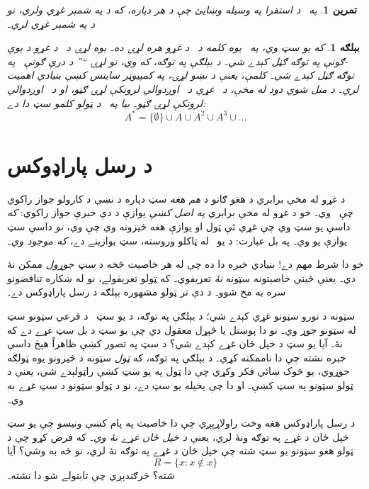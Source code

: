 \documentclass[12pt,a4paper]{article}
\newcommand{\Setabs}[2]{\{#1 : #2\}}
\newcommand{\tuple}[1]{\langle #1\rangle}
\newcommand{\olfileid}[3]{\gdef\pspart{#1}\gdef\pschapter{#2}\gdef\pssection{#3}}
\newcommand{\olsection}[1]{\section{#1}\label{\pspart:\pschapter:\pssection:sec}}
\newtheorem{ex}[defn]{بېلګه}
\newtheorem{prob}[defn]{تمرين}
\begin{document}
\begin{prob}
په~ د استقرا په وسيله وښايئ چې د هر  دپاره، که  د  په شمېر غړي ولري، نو  د  په شمېر غړي لري۔
\end{prob}

\begin{ex}
که  يو سټ وي، په~ يوه \emph{کلمه} د~ د غړو هره لړۍ ده۔ يوه لړۍ د~ د غړو د يوې -ګونې په توګه ګڼل کېدے شي۔ د بېلګې په توګه، که  وي، نو لړۍ ``'' د درې ګونې~\LR{$\tuple{b, a, c}$} په توګه ګڼل کېدے شي۔ کلمې، يعنې د نښو لړۍ، په کمپيوټر ساينس کښې بنيادي اهميت لري۔ د منل شوي دود له مخې، د~ غړي د~ اوږدوالي لرونکې لړۍ ګڼو، او \LR{$\emptyset$} د~ اوږدوالي لرونکې لړۍ ګڼو۔ بيا په~ د \emph{ټولو} کلمو سټ دا دے:
\[
A^* = \{\emptyset\} \cup A \cup A^2 \cup A^3 \cup \dots
\]
\end{ex}



\olfileid{sfr}{set}{rus}
\olsection{د رسل پاراډوکس}

د غړو له مخې برابري د هغو  ګانو د \emph{هم هغه} سټ دپاره د \LR{$\Setabs{x}{\phi(x)}$} نښې د کارولو جواز راکوي چې~ وي۔ خو د غړو له مخې برابري \emph{په اصل کښې} يوازې د دې خبرې جواز راکوي: \emph{که} داسې يو سټ وي چې غړي ئې ټول او يوازې هغه څيزونه وي چې \LR{$\phi$} وي، \emph{نو} داسې سټ يوازې يو وي۔ په بل عبارت: د يو~\LR{$\phi$} له ټاکلو وروسته، سټ \LR{$\Setabs{x}{\phi(x)}$} يوازينے دے، \emph{که موجود وي}۔

خو دا شرط مهم دے!{} بنيادي خبره دا ده چې له هر خاصيت څخه د \emph{سټ جوړول} ممکن نۀ دي۔ يعنې ځينې خاصيتونه سټونه \emph{نۀ} تعريفوي۔ که ټولو تعريفولے، نو له ښکاره تناقضونو سره به مخ شوو۔ د دې تر ټولو مشهوره بېلګه د رسل پاراډوکس دے۔

سټونه د نورو سټونو غړي کېدے شي؛ د بېلګې په توګه، د يو سټ~ د فرعي سټونو سټ له سټونو جوړ وي۔ نو دا پوښتل يا څېړل معقول دي چې يو سټ د بل سټ غړے دے که نۀ۔ آيا يو سټ د خپل ځان غړے کېدے شي؟ د سټ په تصور کښې ظاهراً هېڅ داسې خبره نشته چې دا ناممکنه کړي۔ د بېلګې په توګه، که \emph{ټول} سټونه د څيزونو يوه ټولګه جوړوي، يو څوک ښائي فکر وکړي چې دا ټول په يو سټ کښې راټولېدے شي، يعنې د ټولو سټونو په سټ کښې۔ او دا چې پخپله يو سټ دے، نو د ټولو سټونو د سټ غړے به وي۔

د رسل پاراډوکس هغه وخت راولاړېږي چې دا خاصيت په پام کښې ونيسو چې يو سټ خپل ځان د غړے په توګه ونۀ لري، يعنې \emph{د خپل ځان غړے نۀ وي}۔ که فرض کړو چې د ټولو هغو سټونو يو سټ شته چې خپل ځان د غړے په توګه نۀ لري، نو څه به وشي؟ آيا
\[
R = \Setabs{x}{x \notin x}
\]
شته؟ څرګندېږي چې ثابتولے شو دا نشته۔
\end{document}
